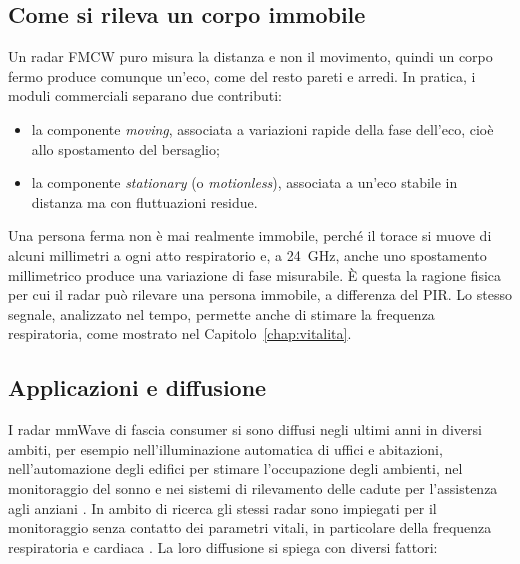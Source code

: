 \FloatBarrier
\subsection{Come si rileva un corpo immobile}
\label{subsec:corpo-immobile}

Un radar FMCW puro misura la distanza e non il movimento, quindi un corpo fermo produce comunque un'eco, come del resto pareti e arredi. In pratica, i moduli commerciali separano due contributi:

\begin{itemize}
    \item la componente \textit{moving}, associata a variazioni rapide della fase dell'eco, cioè allo spostamento del bersaglio;

    \item la componente \textit{stationary} (o \textit{motionless}), associata a un'eco stabile in distanza ma con fluttuazioni residue.
\end{itemize}

Una persona ferma non è mai realmente immobile, perché il torace si muove di alcuni millimetri a ogni atto respiratorio e, a 24~GHz, anche uno spostamento millimetrico produce una variazione di fase misurabile. È questa la ragione fisica per cui il radar può rilevare una persona immobile, a differenza del PIR. Lo stesso segnale, analizzato nel tempo, permette anche di stimare la frequenza respiratoria, come mostrato nel Capitolo~\ref{chap:vitalita}.

\subsection{Applicazioni e diffusione}
\label{subsec:mmwave-usi}

I radar mmWave di fascia consumer si sono diffusi negli ultimi anni in diversi ambiti, per esempio nell'illuminazione automatica di uffici e abitazioni, nell'automazione degli edifici per stimare l'occupazione degli ambienti, nel monitoraggio del sonno e nei sistemi di rilevamento delle cadute per l'assistenza agli anziani \cite{mmwaveOccupancy}. In ambito di ricerca gli stessi radar sono impiegati per il monitoraggio senza contatto dei parametri vitali, in particolare della frequenza respiratoria e cardiaca \cite{upm2024vitals,uts2024vitals,mdpi2024mmwaverm}. La loro diffusione si spiega con diversi fattori:

